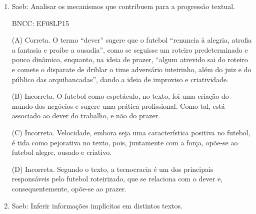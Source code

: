 \begin{enumerate}
(A) Correta. As informações que constam na bula de remédio são
importantes para o correto uso do medicamento. Além disso, sua
finalidade comunicativa é orientar o usuário nesse uso correto, daí a
necessidade de uma linguagem objetiva na exposição das informações do
medicamento e das orientações de uso, para que a saúde não seja posta em
risco pelo mau uso.

(B) Incorreta. A bula de remédio é um texto predominantemente
informativo e expositivo, pois a intenção é que o usuário faça um uso
seguro e correto. Assim, não há intenção de fazer juízo de valor sobre o
uso ou não uso do medicamento, nem sobre suas qualidades ou defeitos.

(C) Incorreta. Não há menção a tempo, espaço, personagens etc. no texto
da bula de remédio, nem relato de acontecimentos, e sim exposição de
informações.

(D) Incorreta. A linguagem figurada expressa sentidos pouco claros e
mais interpretativos, o que não é útil na compreensão dos dados de um
medicamento.


\item

Saeb: Analisar os mecanismos que contribuem para a progressão textual.

BNCC: EF08LP15

(A) Correta. O termo ``dever'' sugere que o futebol ``renuncia à
alegria, atrofia a fantasia e proíbe a ousadia'', como se seguisse um
roteiro predeterminado e pouco dinâmico, enquanto, na ideia de prazer,
``algum atrevido sai do roteiro e comete o disparate de driblar o time
adversário inteirinho, além do juiz e do público das arquibancadas'',
dando a ideia de improviso e criatividade.

(B) Incorreta. O futebol como espetáculo, no texto, foi uma criação do
mundo dos negócios e sugere uma prática profissional. Como tal, está
associado ao dever do trabalho, e não do prazer.

(C) Incorreta. Velocidade, embora seja uma característica positiva no
futebol, é tida como pejorativa no texto, pois, juntamente com a força,
opõe-se ao futebol alegre, ousado e criativo.

(D) Incorreta. Segundo o texto, a tecnocracia é um dos principais
responsáveis pelo futebol roteirizado, que se relaciona com o dever e,
consequentemente, opõe-se ao prazer.


\item

Saeb: Inferir informações implícitas em distintos textos.


\end{enumerate}
